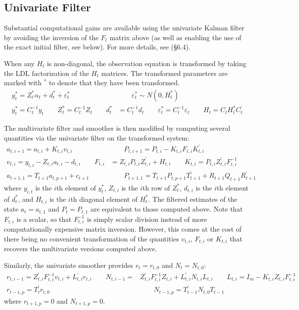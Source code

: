 \documentclass[12pt]{article}
\begin{document}
\subsection*{Univariate Filter}
	Substantial computational gains are available using the univariate Kalman filter by avoiding the inversion of the $F_t$ matrix above (as well as enabling the use of the exact initial filter, see below). For more details, see \cite{dk_book} (\S 6.4). 

	When any $H_t$ is non-diagonal, the observation equation is transformed by taking the LDL factorization of the $H_t$ matrices. The transformed parameters are marked with $^*$ to denote that they have been transformed.
	\begin{align*}
	y_t^* = Z_t^* \alpha_t + d_t^* + \varepsilon_t^* &\qquad \varepsilon_t^* \sim N(0, H_t^*)\\
	y_t^* = C_t^{-1} y_t \qquad Z_t^* = C_t^{-1} Z_t \qquad d_t^* &= C_t^{-1} d_t \qquad \varepsilon_t^* = C_t^{-1} \varepsilon_t \qquad H_t = C_t H_t^* C_t^\prime
	\end{align*}

	The multivariate filter and smoother is then modified by computing several quantities via the univariate filter  on the transformed system: 
	\begin{align*}
	a_{t, i+1} = a_{t,i} + K_{t,i} v_{t,i} &\qquad P_{t,i+1} = P_{t,i} - K_{t,i} F_{t,i} K_{t,i}^{\prime} \\
	v_{t,i} = y_{t,i} - Z_{t,i} a_{t,i} - d_{t,i} \qquad F_{t,i} &= Z_{t,i} P_{t,i} Z_{t,i}^\prime + H_{t,i} \qquad K_{t,i} = P_{t,i} Z_{t,i}^\prime F_{t,i}^{-1} \\ 
	a_{t+1,1} = T_{t+1} a_{t, p+1} + c_{t+1} &\qquad P_{t+1,1} = T_{t+1} P_{t,p+1} T_{t+1}^\prime + R_{t+1} Q_{t+1} R_{t+1}^\prime
	\end{align*}
	where $y_{i,t}$ is the $i$th element of $y_t^*$, $Z_{t,i}$ is the $i$th row of $Z_t^*$, $d_{t,i}$ is the $i$th element of $d_t^*$, and $H_{t,i}$ is the $i$th diagonal element of $H_t^*$. The filtered estimates of the state $a_t = a_{t,1}$ and $P_t = P_{t,1}$ are equivalent to those computed above. Note that $F_{t,i}$ is a scalar, so that $F_{t,i}^{-1}$ is simply scalar division instead of more computationally expensive matrix inversion. However, this comes at the cost of there being no convenient transformation of the quantities $v_{t,i}$, $F_{t,i}$ or $K_{t,i}$ that recovers the multivariate versions computed above.

	Similarly, the univariate smoother provides $r_t = r_{t,0}$ and $N_t = N_{t,0}$:
	\begin{align*}
	r_{t,i-1} = Z_{t,i}^\prime F_{t,i}^{-1} v_{t,i} + L_{t,i}^{\prime} r_{t,i} \qquad N_{t,i-1} =& Z_{t,i}^\prime F_{t,i}^{-1} Z_{t,i} + L_{t,i}^{\prime} N_{t,i} L_{t,i} \qquad L_{t,i} = I_m - K_{t,i} Z_{t,i} F_{t,i}^{-1}\\
	r_{t-1,p} = T_{t}^\prime r_{t,0} &\qquad N_{t-1,p} = T_{t-1}^\prime N_{t,0} T_{t-1}
	\end{align*}
	where $r_{t+1,p} = 0$ and $N_{t+1,p} = 0$. 
\end{document}
